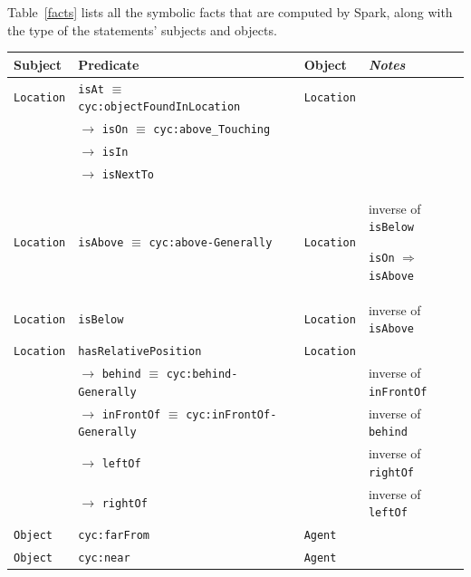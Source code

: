 \documentclass[preprint,3p,times]{elsarticle}
\newcommand{\concept}[1]{{\small \texttt{#1}}}
\begin{document}
Table~\ref{facts} lists all the symbolic facts that are computed by {\sc Spark},
along with the type of the statements' subjects and objects.

\renewcommand{\concept}[1]{{\scriptsize \texttt{#1}}}
\begin{table}[h]
    \centering
    \begin{tabular}{p{1.5cm}lp{2cm}p{3.7cm}}
    \textbf{Subject} & \textbf{Predicate} & \textbf{Object} & \emph{Notes} \\ 
    \hline
	 \concept{Location} & \concept{isAt} $\equiv$ \concept{cyc:objectFoundInLocation}  &  \concept{Location} & \\ 
	 &  $\rightarrow$ \concept{isOn} $\equiv$ \concept{cyc:above\_Touching}  &  & \\ 
	 &  $\rightarrow$ \concept{isIn}  &  & \\ 
	 &  $\rightarrow$ \concept{isNextTo}  & &  \\ 
	 \concept{Location}  & \concept{isAbove} $\equiv$ \concept{cyc:above-Generally}  &  \concept{Location}  &  inverse of \concept{isBelow} \par \concept{isOn} $\Rightarrow$ \concept{isAbove}\\ 
	 \concept{Location}  & \concept{isBelow}  & \concept{Location}  &  inverse
	of \concept{isAbove} \\
	\hline
	 \concept{Location}  & \concept{hasRelativePosition}  & \concept{Location} & \\ 
	 & 	$\rightarrow$ \concept{behind} $\equiv$ \concept{cyc:behind-Generally}  &  & inverse of \concept{inFrontOf}  \\ 
	 &  $\rightarrow$ \concept{inFrontOf} $\equiv$ \concept{cyc:inFrontOf-Generally}  & 	 & 	 inverse of \concept{behind}  \\ 
	 &  $\rightarrow$ \concept{leftOf}  &  &  inverse of \concept{rightOf} \\ 
	 &  $\rightarrow$ \concept{rightOf}  & 	 & 	 inverse of \concept{leftOf}  \\ 
	 \concept{Object}  & \concept{cyc:farFrom}  &  \concept{Agent} & \\ 
	 \concept{Object}  & \concept{cyc:near}  &  \concept{Agent} & \\


\end{tabular}
\end{table}
\end{document}
